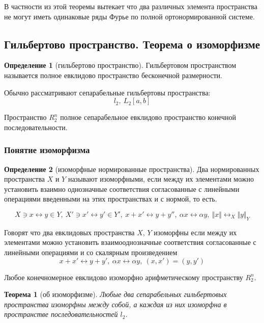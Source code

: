 \documentclass[14pt,a4paper]{extarticle}
\newtheorem{theorem}{Теорема}[section]
\theoremstyle{definition}
\newtheorem{definition}{Определение}[section]
\theoremstyle{remark}
\renewcommand{\[}{\begin{dmath*}[compact]}
\renewcommand{\]}{\end{dmath*}}
\newcommand{\sep}{ , \ \allowbreak }
\begin{document}
В частности из этой теоремы вытекает что два различных элемента пространства
не могут иметь одинаковые ряды Фурье по полной ортонормированной системе.

\subsection{Гильбертово пространство. Теорема о изоморфизме}
\label{subsec:gp_toi}

\begin{definition}[гильбертово пространство]
  Гильбертовом пространством называется полное евклидово пространство
  бесконечной размерности.
\end{definition}

Обычно рассматривают сепарабельные гильбертовы пространства:
\[l_2 \sep L_2[a,b]\]

Пространство $R_2^n$ полное сепарабельное евклидово пространство конечной
последовательности.

\subsubsection{Понятие изоморфизма}

\begin{definition}[изоморфные нормированные пространства]
  Два нормированных пространства $X$ и $Y$ называют изоморфными,
  если между их элементами можно установить взаимно однозначные соответствия
  согласованные с линейными операциями введенными на этих пространствах
  и с нормой, то есть.

  \[X\ni x \leftrightarrow y \in Y \sep
  {X'\ni x' \leftrightarrow y' \in Y'} \sep
  {x + x' \leftrightarrow y + y''} \sep
  {\alpha x \leftrightarrow \alpha y} \sep
  {\Vert x \Vert \leftrightarrow_X \Vert y \Vert_Y}\]
\end{definition}

Говорят что два евклидовых пространства $X$, $Y$ изоморфны если между их
элементами можно установить взаимооднозначные соответствия согласованные
с линейными операциями и со скалярным произведением
\[{x+x' \leftrightarrow y + y'} \sep {\alpha x \leftrightarrow \alpha y}
\sep {(x,x')=(y,y')}\]

Любое конечномерное евклидово изоморфно арифметическому пространству $R_2^n$.

\begin{theorem}[об изоморфизме]
\label{th:об изоморфизме}
  Любые два сепарабельных гильбертовых пространства изоморфны между собой,
  а каждая из них изоморфна в пространстве последовательностей $l_2$.
\end{theorem}
\end{document}
